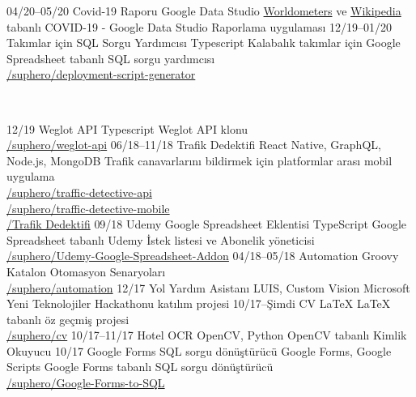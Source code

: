 \documentclass[]{friggeri-cv} %
\begin{document}
\begin{entrylist}

\entry
{04/20--05/20}
{Covid-19 Raporu}
{Google Data Studio}
{\href{https://www.worldometers.info/coronavirus}{Worldometers} ve \href{https://en.wikipedia.org/wiki/COVID-19_pandemic}{Wikipedia} tabanlı COVID-19 - Google Data Studio Raporlama uygulaması}
\entry
{12/19--01/20}
{Takımlar için SQL Sorgu Yardımcısı}
{Typescript}
{Kalabalık takımlar için Google Spreadsheet tabanlı SQL sorgu yardımcısı
\\\href{https://github.com/suphero/deployment-script-generator}{\faGithub/suphero/deployment-script-generator}}
\end{entrylist}
\\
\begin{entrylist}
\entry
{12/19}
{Weglot API}
{Typescript}
{Weglot API klonu
\\\href{https://github.com/suphero/weglot-api}{\faGithub/suphero/weglot-api}}
\entry
{06/18--11/18}
{Trafik Dedektifi}
{React Native, GraphQL, Node.js, MongoDB}
{Trafik canavarlarını bildirmek için platformlar arası mobil uygulama
\\\href{https://github.com/suphero/traffic-detective-api}{\faGithub/suphero/traffic-detective-api}
\\\href{https://github.com/suphero/traffic-detective-mobile}{\faGithub/suphero/traffic-detective-mobile}
\\\href{https://play.google.com/store/apps/details?id=com.harunsokullu.trafficdetective}{\faAndroid/Trafik Dedektifi}}
\entry
{09/18}
{Udemy Google Spreadsheet Eklentisi}
{TypeScript}
{Google Spreadsheet tabanlı Udemy İstek listesi ve Abonelik yöneticisi
\\\href{https://github.com/suphero/Udemy-Google-Spreadsheet-Addon}{\faGithub/suphero/Udemy-Google-Spreadsheet-Addon}}
\entry
{04/18--05/18}
{Automation}
{Groovy}
{Katalon Otomasyon Senaryoları
\\\href{https://github.com/suphero/automation}{\faGithub/suphero/automation}}
\entry
{12/17}
{Yol Yardım Asistanı}
{LUIS, Custom Vision}
{Microsoft Yeni Teknolojiler Hackathonu katılım projesi}
\entry
{10/17--Şimdi}
{CV}
{\LaTeX}
{LaTeX tabanlı öz geçmiş projesi
\\\href{https://github.com/suphero/cv}{\faGithub/suphero/cv}}
\entry
{10/17--11/17}
{Hotel OCR}
{OpenCV, Python}
{OpenCV tabanlı Kimlik Okuyucu}
\entry
{10/17}
{Google Forms SQL sorgu dönüştürücü}
{Google Forms, Google Scripts}
{Google Forms tabanlı SQL sorgu dönüştürücü
\\\href{https://github.com/suphero/Google-Forms-to-SQL}{\faGithub/suphero/Google-Forms-to-SQL}}

\end{entrylist}
\end{document}
